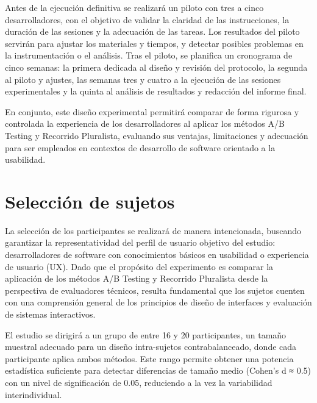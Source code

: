 \documentclass[a4paper,12pt]{report}
\begin{document}
Antes de la ejecución definitiva se realizará un piloto con tres a cinco desarrolladores, con el objetivo de validar la claridad de las instrucciones, la duración de las sesiones y la adecuación de las tareas. Los resultados del piloto servirán para ajustar los materiales y tiempos, y detectar posibles problemas en la instrumentación o el análisis. Tras el piloto, se planifica un cronograma de cinco semanas: la primera dedicada al diseño y revisión del protocolo, la segunda al piloto y ajustes, las semanas tres y cuatro a la ejecución de las sesiones experimentales y la quinta al análisis de resultados y redacción del informe final.

En conjunto, este diseño experimental permitirá comparar de forma rigurosa y controlada la experiencia de los desarrolladores al aplicar los métodos A/B Testing y Recorrido Pluralista, evaluando sus ventajas, limitaciones y adecuación para ser empleados en contextos de desarrollo de software orientado a la usabilidad.


\section{Selección de sujetos}

La selección de los participantes se realizará de manera intencionada, buscando garantizar la representatividad del perfil de usuario objetivo del estudio: desarrolladores de software con conocimientos básicos en usabilidad o experiencia de usuario (UX). Dado que el propósito del experimento es comparar la aplicación de los métodos A/B Testing y Recorrido Pluralista desde la perspectiva de evaluadores técnicos, resulta fundamental que los sujetos cuenten con una comprensión general de los principios de diseño de interfaces y evaluación de sistemas interactivos.

El estudio se dirigirá a un grupo de entre 16 y 20 participantes, un tamaño muestral adecuado para un diseño intra-sujetos contrabalanceado, donde cada participante aplica ambos métodos. Este rango permite obtener una potencia estadística suficiente para detectar diferencias de tamaño medio (Cohen’s d ≈ 0.5) con un nivel de significación de 0.05, reduciendo a la vez la variabilidad interindividual.
\end{document}
